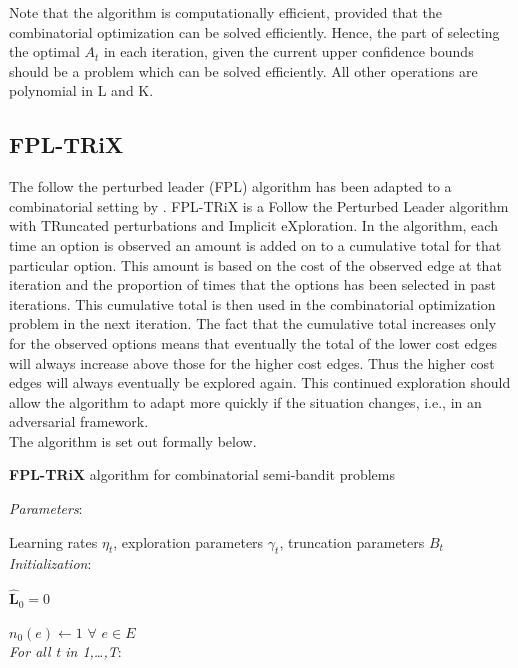 Note that the algorithm is computationally efficient, provided that the combinatorial optimization can be solved efficiently. Hence, the part of selecting the optimal $A_t$ in each iteration, given the current upper confidence bounds should be a problem which can be solved efficiently. All other operations are polynomial in L and K.\\


\subsection{FPL-TRiX}

The follow the perturbed leader (FPL) algorithm has been adapted to a combinatorial setting by \cite{neu2015first}. FPL-TRiX is a Follow the Perturbed Leader algorithm with TRuncated perturbations and Implicit eXploration. In the algorithm, each time an option is observed an amount is added on to a cumulative total for that particular option. This amount is based on the cost of the observed edge at that iteration and the proportion of times that the options has been selected in past iterations. This cumulative total is then used in the combinatorial optimization problem in the next iteration. The fact that the cumulative total increases only for the observed options means that eventually the total of the lower cost edges will always increase above those for the higher cost edges. Thus the higher cost edges will always eventually be explored again. This continued exploration should allow the algorithm to adapt more quickly if the situation changes, i.e., in an adversarial framework.\\

\noindent The algorithm is set out formally below.

\noindent \hrulefill

\noindent \textbf{FPL-TRiX} algorithm for combinatorial semi-bandit problems

\noindent \hrulefill

\noindent \textit{Parameters}:

Learning rates $\eta_t$, exploration parameters $\gamma_t$, truncation parameters $B_t$\\

\noindent \textit{Initialization}:

$\mathbf{\hat{L}}_0 = 0$

$n_0(e) \leftarrow 1$ $\forall$ $e \in E$\\

\noindent \textit{For all t in 1,\ldots,T}:

